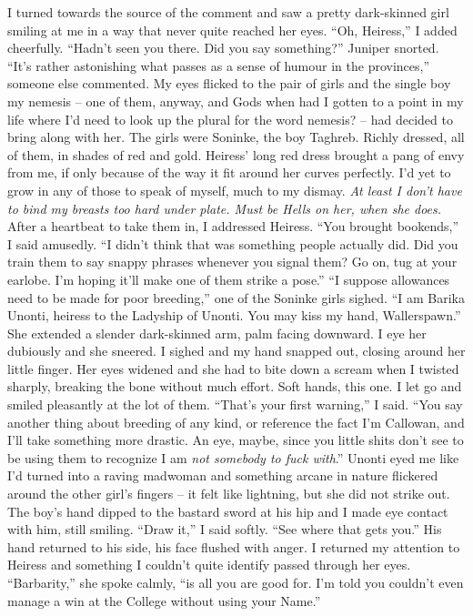 \documentclass[12pt, openany]{book}
\begin{document}
I turned towards the source of the comment and saw a pretty dark-skinned girl smiling at me in a way that never quite reached her eyes.
“Oh, Heiress,” I added cheerfully. “Hadn’t seen you there. Did you say something?”
Juniper snorted.
“It’s rather astonishing what passes as a sense of humour in the provinces,” someone else commented.
My eyes flicked to the pair of girls and the single boy my nemesis – one of them, anyway, and Gods when had I gotten to a point in my life where I’d need to look up the plural for the word nemesis? – had decided to bring along with her. The girls were Soninke, the boy Taghreb. Richly dressed, all of them, in shades of red and gold. Heiress’ long red dress brought a pang of envy from me, if only because of the way it fit around her curves perfectly. I’d yet to grow in any of those to speak of myself, much to my dismay. \textit{At least I don’t have to bind my breasts too hard under plate. Must be Hells on her, when she does.} After a heartbeat to take them in, I addressed Heiress.
“You brought bookends,” I said amusedly. “I didn’t think that was something people actually did. Did you train them to say snappy phrases whenever you signal them? Go on, tug at your earlobe. I’m hoping it’ll make one of them strike a pose.”
“I suppose allowances need to be made for poor breeding,” one of the Soninke girls sighed. “I am Barika Unonti, heiress to the Ladyship of Unonti. You may kiss my hand, Wallerspawn.”
She extended a slender dark-skinned arm, palm facing downward. I eye her dubiously and she sneered. I sighed and my hand snapped out, closing around her little finger. Her eyes widened and she had to bite down a scream when I twisted sharply, breaking the bone without much effort. Soft hands, this one. I let go and smiled pleasantly at the lot of them.
“That’s your first warning,” I said. “You say another thing about breeding of any kind, or reference the fact I’m Callowan, and I’ll take something more drastic. An eye, maybe, since you little shits don’t see to be using them to recognize I am \textit{not somebody to fuck with}.”
Unonti eyed me like I’d turned into a raving madwoman and something arcane in nature flickered around the other girl’s fingers – it felt like lightning, but she did not strike out. The boy’s hand dipped to the bastard sword at his hip and I made eye contact with him, still smiling.
“Draw it,” I said softly. “See where that gets you.”
His hand returned to his side, his face flushed with anger. I returned my attention to Heiress and something I couldn’t quite identify passed through her eyes.
“Barbarity,” she spoke calmly, “is all you are good for. I’m told you couldn’t even manage a win at the College without using your Name.”
\end{document}
